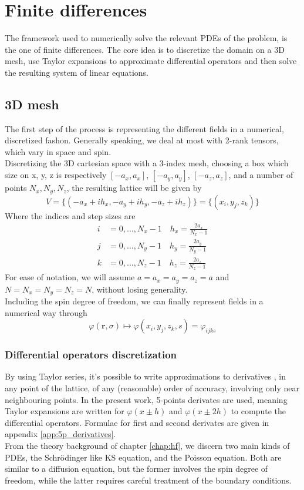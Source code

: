 \section{Finite differences}
\label{sec:finite_diff}
The framework used to numerically solve the relevant PDEs of the problem, is the one of finite differences. The core idea is to discretize the domain on a 3D mesh, use Taylor expansions to approximate differential operators and then solve the resulting system of linear equations.
\subsection{3D mesh}
The first step of the process is representing the different fields in a numerical, discretized fashon.
Generally speaking, we deal at most with 2-rank tensors, which vary in space and spin. 
\\Discretizing the 3D cartesian space with a 3-index mesh, choosing a box which size on x, y, z is respectively $[-a_x, a_x]$, $[-a_y, a_y]$, $[-a_z, a_z]$, and a number of points $N_x, N_y, N_z$, the resulting lattice will be given by
\begin{equation*}
V=\{(-a_x+ih_x, -a_y+ih_y, -a_z+ih_z)\} = \{(x_i, y_j,z_k)\} 
\end{equation*}
Where the indices and step sizes are
\begin{align*}
  i&=0,\ldots,N_x-1\quad h_x = \frac{2a_x}{N_x-1}\\
  j&=0,\ldots,N_y-1\quad h_y = \frac{2a_y}{N_y-1}\\
  k&=0,\ldots,N_z-1\quad h_z = \frac{2a_z}{N_z-1}
\end{align*}
For ease of notation, we will assume $a=a_x=a_y=a_z=a$ and $N=N_x=N_y=N_z=N$, without losing generality.
\\Including the spin degree of freedom, we can finally represent fields in a numerical way through
\begin{equation}
    \varphi(\bm r, \sigma) \mapsto \varphi(x_i, y_j, z_k, s) = \varphi_{ijks}
\end{equation}
\subsubsection{Differential operators discretization}
By using Taylor series, it's possible to write approximations to derivatives \cite{Zhou1993}, in any point of the lattice, of any (reasonable) order of accuracy, involving only near neighbouring points. In the present work, 5-points derivates are used, meaning Taylor expansions are written for $\varphi(x\pm h)$ and $\varphi(x\pm 2h)$ to compute the differential operators. Formulae for first and second derivates are given in appendix \ref{app:5p_derivatives}.
\\From the theory background of chapter \ref{chap:hf}, we discern two main kinds of PDEs, the Schr\"odinger like KS equation, and the Poisson equation. Both are similar to a diffusion equation, but the former involves the spin degree of freedom, while the latter requires careful treatment of the boundary conditions.
